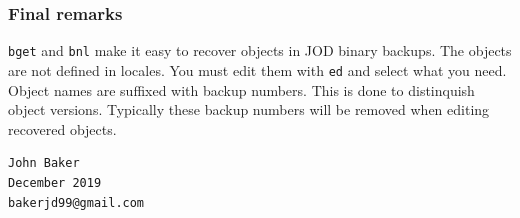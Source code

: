 \documentclass[11pt,letter,landscape]{article}
\begin{document}
    \subsubsection{Final remarks}\label{final-remarks}

\texttt{bget} and \texttt{bnl} make it easy to recover objects in JOD
binary backups. The objects are not defined in locales. You must edit
them with \texttt{ed} and select what you need. Object names are
suffixed with backup numbers. This is done to distinquish object
versions. Typically these backup numbers will be removed when editing
recovered objects.

\begin{verbatim}
John Baker 
December 2019
bakerjd99@gmail.com
\end{verbatim}


    
    
    
    
\end{document}
